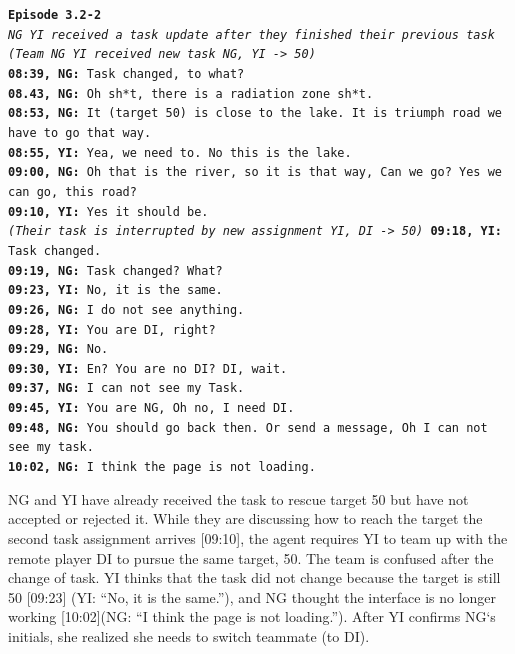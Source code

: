 \noindent\texttt{\textbf{Episode 3.2-2}\\
\emph{NG YI received a task update after they finished their previous task}\\
\emph{(Team NG YI received new task NG, YI -> 50)}\\
\textbf{08:39, NG: } Task changed, to what? \\
\textbf{08.43, NG: } Oh sh*t, there is a radiation zone sh*t. \\
\textbf{08:53, NG: } It (target 50) is close to the lake. It is triumph road we have to go that way. \\
\textbf{08:55, YI: } Yea, we need to. No this is the lake. \\
\textbf{09:00, NG: } Oh that is the river, so it is that way, Can we go? Yes we can go, this road?\\
\textbf{09:10, YI: } Yes it should be. \\
\emph{(Their task is interrupted by new assignment YI, DI -> 50)}
\textbf{09:18, YI: } Task changed.\\
\textbf{09:19, NG: } Task changed? What? \\
\textbf{09:23, YI: } No, it is the same.  \\
\textbf{09:26, NG: } I do not see anything. \\
\textbf{09:28, YI: } You are DI, right?\\
\textbf{09:29, NG: } No.\\
\textbf{09:30, YI: } En? You are no DI? DI, wait. \\
\textbf{09:37, NG: } I can not see my Task.\\
\textbf{09:45, YI: } You are NG, Oh no, I need DI.  \\
\textbf{09:48, NG: } You should go back then. Or send a message, Oh I can not see my task.\\
\textbf{10:02, NG: } I think the page is not loading.\\
}
 
NG and YI have already received the task to rescue target 50 but have not accepted or rejected it. While they are discussing how to reach the target the second task assignment arrives [09:10], the agent requires YI to team up with the remote player DI to pursue the same target, 50. The team is confused after the change of task. YI thinks that the task did not change because the target is still 50 [09:23] (YI: ``No, it is the same.''), and NG thought the interface is no longer working [10:02](NG: ``I think the page is not loading.''). After YI confirms NG`s initials, she realized she needs to switch teammate (to DI). \\

